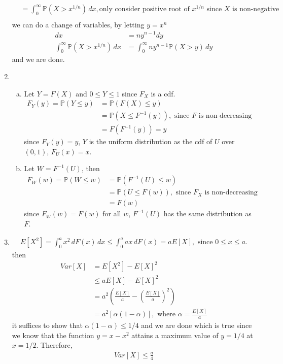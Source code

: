 \documentclass[a4paper,10pt]{article}
\theoremstyle{definition}
\begin{document}
\begin{enumerate}
\begin{align*}
&=\int_{0}^{\infty}\mathbb{P}(X>x^{1/n})\,dx, \text{only consider positive root of $x^{1/n}$ since $X$ is non-negative}\\
\end{align*}
we can do a change of variables, by letting $y=x^n$
\begin{align*}
dx&=ny^{n-1}dy\\
\int_{0}^{\infty}\mathbb{P}(X>x^{1/n})\,dx&=\int_{0}^{\infty}ny^{n-1}\mathbb{P}(X>y)\,dy
\end{align*}
and we are done.
\item
\hfill
\begin{enumerate}[(a)]
\item Let $Y=F(X)$ and $0\leq Y \leq 1$ since $F_X$ is a cdf.
\begin{align*}
F_Y(y)=\mathbb{P}(Y\leq y)&=\mathbb{P}(F(X)\leq y)\\
&=\mathbb{P}(X\leq F^{-1}(y)), \text{ since $F$ is non-decreasing }\\
&=F(F^{-1}(y))=y
\end{align*}
since $F_Y(y)=y$, $Y$ is the uniform distribution as the cdf of $U$ over $(0,1)$, $F_U( x)=x$.
\item Let $W=F^{-1}(U)$, then
\begin{align*}
F_W(w) = \mathbb{P}(W\leq w)&=\mathbb{P}(F^{-1}(U)\leq w)\\
&=\mathbb{P}(U\leq F(w)), \text{ since $F_X$ is non-decreasing}\\
&=F(w)
\end{align*}
since $F_W(w)=F(w)$ for all $w$, $F^{-1}(U)$ has the same distribution as $F$.
\end{enumerate}

\item 
\begin{align*}
E[X^2]=\int_{0}^{a}x^2\,dF(x)\,dx \leq \int_{0}^{a}ax\,dF(x) =aE[X], \text{ since $0\leq x \leq a$.}
\end{align*}
then
\begin{align*}
Var[X] &= E[X^2]-E[X]^2\\
&\leq aE[X]-E[X]^2\\
&=a^2\left(\frac{E[X]}{a}-\left(\frac{E[X]}{a}\right)^2\right)\\
&=a^2\left[\alpha(1-\alpha)\right], \text{ where $\alpha=\frac{E[X]}{a}$}
\end{align*}
it suffices to show that $\alpha(1-\alpha)\leq 1/4$ and we are done which is true since we know that the function $y=x-x^2$ attains a maximum value of $y=1/4$ at $x=1/2$. Therefore,
\begin{align*}
Var[X] \leq \frac{a}{4}
\end{align*}
\end{enumerate}
\end{document}
